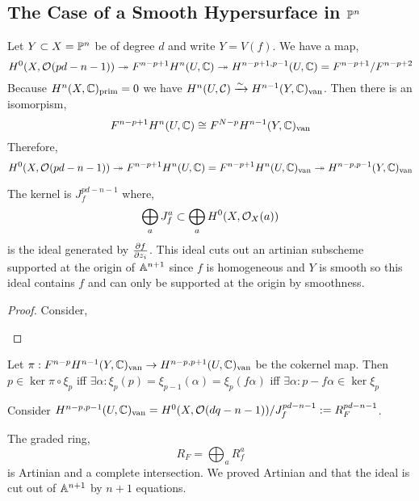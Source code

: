 \documentclass[12pt]{article}
\begin{document}
\subsection{The Case of a Smooth Hypersurface in $\P^n$}

Let $Y \subset X = \P^n$ be of degree $d$ and write $Y = V(f)$. We have a map,
\[ H^0(X, \struct{}(pd - n - 1)) \onto F^{n-p+1} H^n(U, \CC) \onto H^{n-p+1, p-1}(U, \CC) = F^{n-p+1} / F^{n-p+2} \]
Because $H^n(X, \CC)_{\prim} = 0$ we have $H^n(U, \C) \iso H^{n-1}(Y, \CC)_{\van}$. Then there is an isomorpism,
\[ F^{n-p+1} H^n(U, \CC) \cong F^{N-p} H^{n-1}(Y, \CC)_{\van} \]
Therefore, 
\[ H^0(X, \struct{}(pd - n - 1)) \onto F^{n-p+1} H^n(U, \CC) = F^{n-p+1} H^n(U, \CC)_{\van} \onto H^{n-p, p-1}(Y, \CC)_{\van} \]

\begin{theorem}[Griffiths]
The kernel is $J_f^{pd - n - 1}$ where,
\[ \bigoplus_a J^a_f \subset \bigoplus_{a} H^0(X, \struct{X}(a)) \]
is the ideal generated by $\pderiv{f}{z_i}$. This ideal cuts out an artinian subscheme supported at the origin of $\A^{n+1}$ since $f$ is homogeneous and $Y$ is smooth so this ideal contains $f$ and can only be supported at the origin by smoothness. 
\end{theorem}

\begin{proof}
Consider,
\begin{center}
\end{center}
\end{proof}
Let $\pi : F^{n-p} H^{n-1}(Y, \CC)_{\van} \to H^{n-p, p+1}(U, \CC)_{\van}$ be the cokernel map. 
Then $p \in \ker{\pi \circ \xi_p}$ iff $\exists \alpha : \xi_p(p) = \xi_{p-1}(\alpha) = \xi_p(f \alpha)$ iff $\exists \alpha : p - f \alpha \in \ker{\xi_p}$

\begin{cor}
Consider $H^{n-p, p-1}(U, \CC)_{\van} = H^0(X, \struct{}(dq - n-1)) / J_f^{pd - n - 1} := R_F^{pd - n - 1}$.
\end{cor}

\begin{rmk}
The graded ring,
\[ R_F = \bigoplus_a R_f^a \]
is Artinian and a complete intersection. We proved Artinian and that the ideal is cut out of $\A^{n+1}$ by $n+1$ equations. 
\end{rmk}
\end{document}

